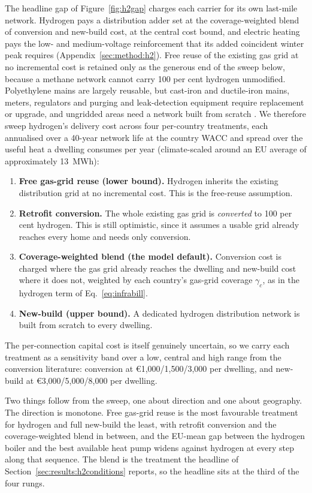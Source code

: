 The headline gap of Figure~\ref{fig:h2gap} charges each carrier for its own
last-mile network. Hydrogen pays a distribution adder set at the coverage-weighted
blend of conversion and new-build cost, at the central cost bound, and electric
heating pays the low- and medium-voltage reinforcement that its added coincident
winter peak requires (Appendix~\ref{sec:method:h2}). Free reuse of the existing gas
grid at no incremental cost is retained only as the generous end of the sweep
below, because a methane network cannot carry 100 per cent hydrogen unmodified.
Polyethylene mains are largely reusable, but cast-iron and ductile-iron mains,
meters, regulators and purging and leak-detection equipment require replacement or
upgrade, and ungridded areas need a network built from scratch
\citep{NorthernGasNetworks2018h21,GasForClimate2020backbone}. We therefore sweep
hydrogen's delivery cost across four per-country treatments, each annualised over a
40-year network life at the country WACC and spread over the useful heat a dwelling
consumes per year (climate-scaled around an EU average of approximately 13~MWh):
\begin{enumerate}
    \item \textbf{Free gas-grid reuse (lower bound).} Hydrogen inherits the
    existing distribution grid at no incremental cost. This is the free-reuse assumption.
    \item \textbf{Retrofit conversion.} The whole existing gas grid is
    \emph{converted} to 100 per cent hydrogen. This is still optimistic, since it
    assumes a usable grid already reaches every home and needs only conversion.
    \item \textbf{Coverage-weighted blend (the model default).} Conversion cost is
    charged where the gas grid already reaches the dwelling and new-build cost
    where it does not, weighted by each country's gas-grid coverage $\gamma_c$, as
    in the hydrogen term of Eq.~\eqref{eq:infrabill}.
    \item \textbf{New-build (upper bound).} A dedicated hydrogen distribution
    network is built from scratch to every dwelling.
\end{enumerate}
The per-connection capital cost is itself genuinely uncertain, so we carry each
treatment as a sensitivity band over a low, central and
high range from the conversion literature: conversion at
\euro{}1{,}000/1{,}500/3{,}000 per dwelling, and new-build at
\euro{}3{,}000/5{,}000/8{,}000 per dwelling.

Two things follow from the sweep, one about direction and one about geography. The
direction is monotone. Free gas-grid reuse is the most favourable
treatment for hydrogen and full new-build the least, with retrofit conversion and
the coverage-weighted blend in between, and the EU-mean gap between the hydrogen
boiler and the best available heat pump widens against hydrogen at every step along
that sequence. The blend is the treatment the headline of
Section~\ref{sec:results:h2conditions} reports, so the headline sits at the third of the four rungs.

